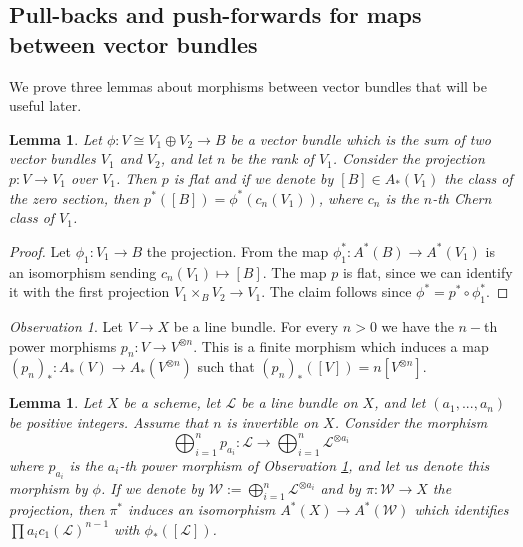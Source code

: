 \documentclass[11pt]{amsart}
\newtheorem{lemma}[theorem]{Lemma}
\theoremstyle{definition}
\theoremstyle{remark}
\newtheorem{observation}{Observation}
\newcommand{\calL}{\mathcal L}
\newcommand{\calW}{\mathcal W}
\begin{document}
\subsection{Pull-backs and push-forwards for maps between vector bundles}
We prove three lemmas about morphisms between vector bundles that will be useful later.
\begin{lemma}\label{lemma_pull_back_class_vb}
Let $\phi: V\cong V_1\oplus V_2 \to B$ be a vector bundle which is the sum of two vector bundles $V_1$ and $V_2$, and let $n$ be the rank of $V_1$. Consider the projection $p:V\to V_1$ over $V_1$. Then $p$ is flat and if we denote by $[B]\in A_*(V_1)$ the class of the zero section, then $p^*([B]) = \phi^*(c_n(V_1))$, where $c_n$ is the $n$-th Chern class of $ V_1$.
\end{lemma}
\begin{proof}Let $\phi_1:V_1\to B$ the projection. 
From \cite[Proposition 1.9, Theorem 14.1]{Ful13} the map $\phi_1^*:A^*(B)\to A^*(V_1)$ is an isomorphism sending $c_n(V_1)\mapsto [B]$. The map $p$ is flat, since we can identify it with the first projection $V_1\times_B V_2\to V_1$. The claim follows since $\phi^* = p^*\circ \phi_1^*$.
\end{proof}
\begin{observation}\label{Oss_push_forward_power_line_bundle}
Let $V\to X$ be a line bundle. For every $n>0$ we have the $n-$th power morphisms $p_n: V\to V^{\otimes n}$. This is a finite morphism which induces a map $(p_n)_*:A_*(V) \to A_*(V^{\otimes n})$ such that $(p_n)_*([V]) = n[V^{\otimes n}]$.
\end{observation}
\begin{lemma}\label{lemma_pushforward_O(-1)_chow}
Let $X$ be a scheme, let $\calL$ be a line bundle on $X$, and let $(a_1,...,a_n)$ be positive integers. Assume that $n$ is invertible on $X$. Consider the morphism $$\bigoplus_{i=1}^n p_{a_i} : \calL \to \bigoplus_{i=1}^n \calL^{\otimes a_i}$$ where $p_{a_i}$ is the $a_i$-th power morphism of
Observation \ref{Oss_push_forward_power_line_bundle}, and let us denote this morphism by $\phi$. If we denote by $\calW:=\bigoplus_{i=1}^n \calL^{\otimes a_i}$ and by $\pi:\calW \to X$ the projection, then $\pi^*$ induces an isomorphism $A^*(X) \to A^*(\calW)$ which identifies $\prod a_i c_1(\calL)^{n-1}$ with $\phi_*([\calL])$.
\end{lemma}
\end{document}
